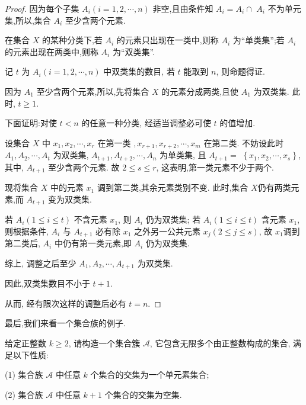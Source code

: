 \begin{proof}
	因为每个子集 $A_{i}(i=1,2, \cdots, n)$ 非空,且由条件知 $A_{i}=A_{i} \cap$ $A_{i}$ 不为单元集,所以,集合 $A_{i}$ 至少含两个元素.

	在集合 $X$ 的某种分类下,若 $A_{i}$ 的元素只出现在一类中,则称 $A_{i}$ 为“单类集”;若 $A_{i}$ 的元素出现在两类中,则称 $A_{i}$ 为“双类集”.

	记 $t$ 为 $A_{i}(i=1,2, \cdots, n)$ 中双类集的数目, 若 $t$ 能取到 $n$, 则命题得证.

	因为 $A_{1}$ 至少含两个元素,所以,先将集合 $X$ 的元素分成两类,且使 $A_{1}$ 为双类集. 此时, $t \geqslant 1$.

	下面证明:对使 $t<n$ 的任意一种分类, 经适当调整必可使 $t$ 的值增加.

	设集合 $X$ 中 $x_{1}, x_{2}, \cdots, x_{r}$ 在第一类 $, x_{r+1}, x_{r+2}, \cdots, x_{m}$ 在第二类. 不妨设此时 $A_{1}, A_{2}, \cdots, A_{t}$ 为双类集, $A_{t+1}, A_{t+2}, \cdots, A_{n}$ 为单类集, 且 $A_{t+1}=$ $\left\{x_{1}, x_{2}, \cdots, x_{s}\right\}$, 其中, $A_{t+1}$ 至少含两个元素. 故 $2 \leqslant s \leqslant r$, 这表明,第一类元素不少于两个.

	现将集合 $X$ 中的元素 $x_{1}$ 调到第二类,其余元素类别不变. 此时,集合 $X$仍有两类元素,而 $A_{t+1}$ 变为双类集.

	若 $A_{i}(1 \leqslant i \leqslant t)$ 不含元素 $x_{1}$, 则 $A_{i}$ 仍为双类集; 若 $A_{i}(1 \leqslant i \leqslant t)$ 含元素 $x_{1}$, 则根据条件, $A_{i}$ 与 $A_{t+1}$ 必有除 $x_{1}$ 之外另一公共元素 $x_{j}(2 \leqslant j \leqslant s)$, 故 $x_{1}$调到第二类后, $A_{i}$ 中仍有第一类元素,即 $A_{i}$ 仍为双类集.

	综上, 调整之后至少 $A_{1}, A_{2}, \cdots, A_{t+1}$ 为双类集.

	因此,双类集数目不小于 $t+1$.

	从而, 经有限次这样的调整后必有 $t=n$.
\end{proof}

最后,我们来看一个集合族的例子.

\begin{example}
	给定正整数 $k \geqslant 2$, 请构造一个集合簇 $\mathscr{A}$, 它包含无限多个由正整数构成的集合, 满足以下性质:

	(1) 集合族 $\mathscr{A}$ 中任意 $k$ 个集合的交集为一个单元素集合;

	(2) 集合族 $\mathscr{A}$ 中任意 $k+1$ 个集合的交集为空集.
\end{example}

